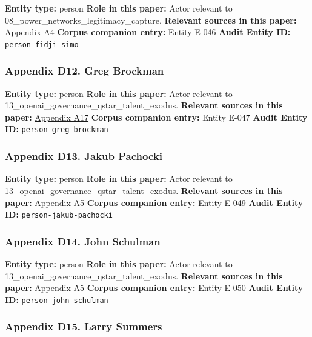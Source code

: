 \documentclass[
  american,
  11pt,
  letterpaper,
]{article}
\begin{document}
\textbf{Entity type:} person \textbf{Role in this paper:} Actor relevant
to 08\_power\_networks\_legitimacy\_capture. \textbf{Relevant sources in
this paper:}
\hyperref[appendix-a4-openai-announces-new-members-to-board-of-directors]{Appendix
A4} \textbf{Corpus companion entry:} Entity E-046 \textbf{Audit Entity
ID:} \texttt{person-fidji-simo}

\subsubsection{Appendix D12. Greg
Brockman}\label{appendix-d12-greg-brockman}

\textbf{Entity type:} person \textbf{Role in this paper:} Actor relevant
to 13\_openai\_governance\_qstar\_talent\_exodus. \textbf{Relevant
sources in this paper:}
\hyperref[appendix-a17-musk-v-altman-4-24-cv-04722]{Appendix A17}
\textbf{Corpus companion entry:} Entity E-047 \textbf{Audit Entity ID:}
\texttt{person-greg-brockman}

\subsubsection{Appendix D13. Jakub
Pachocki}\label{appendix-d13-jakub-pachocki}

\textbf{Entity type:} person \textbf{Role in this paper:} Actor relevant
to 13\_openai\_governance\_qstar\_talent\_exodus. \textbf{Relevant
sources in this paper:}
\hyperref[appendix-a5-openai-board-forms-safety-and-security-committee]{Appendix
A5} \textbf{Corpus companion entry:} Entity E-049 \textbf{Audit Entity
ID:} \texttt{person-jakub-pachocki}

\subsubsection{Appendix D14. John
Schulman}\label{appendix-d14-john-schulman}

\textbf{Entity type:} person \textbf{Role in this paper:} Actor relevant
to 13\_openai\_governance\_qstar\_talent\_exodus. \textbf{Relevant
sources in this paper:}
\hyperref[appendix-a5-openai-board-forms-safety-and-security-committee]{Appendix
A5} \textbf{Corpus companion entry:} Entity E-050 \textbf{Audit Entity
ID:} \texttt{person-john-schulman}

\subsubsection{Appendix D15. Larry
Summers}\label{appendix-d15-larry-summers}
\end{document}
